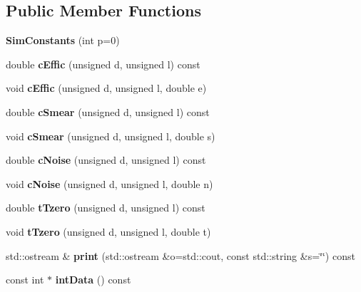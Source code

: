 \subsection*{Public Member Functions}
\begin{DoxyCompactItemize}
\item 
{\bfseries Sim\-Constants} (int p=0)\label{classTBTrack_1_1SimConstants_ac985b42953f6a9db670ac9ebe4491dd3}

\item 
double {\bfseries c\-Effic} (unsigned d, unsigned l) const \label{classTBTrack_1_1SimConstants_a95b2a640d1fdf43d0e138df1c59097da}

\item 
void {\bfseries c\-Effic} (unsigned d, unsigned l, double e)\label{classTBTrack_1_1SimConstants_a57422e75c11ad31c3f76d5ed5357685f}

\item 
double {\bfseries c\-Smear} (unsigned d, unsigned l) const \label{classTBTrack_1_1SimConstants_a5ad8399a9a26ae1a2c8a143a0e34b54d}

\item 
void {\bfseries c\-Smear} (unsigned d, unsigned l, double s)\label{classTBTrack_1_1SimConstants_aef787d85563deecf9fcaf23130e1e6af}

\item 
double {\bfseries c\-Noise} (unsigned d, unsigned l) const \label{classTBTrack_1_1SimConstants_a05135b1be10f15e90b164c2aabd8ae1b}

\item 
void {\bfseries c\-Noise} (unsigned d, unsigned l, double n)\label{classTBTrack_1_1SimConstants_a206034df73ce2b627ca441e078abe2da}

\item 
double {\bfseries t\-Tzero} (unsigned d, unsigned l) const \label{classTBTrack_1_1SimConstants_ac2537bcd88e2578122285edd4387ca1f}

\item 
void {\bfseries t\-Tzero} (unsigned d, unsigned l, double t)\label{classTBTrack_1_1SimConstants_a326a04e3e174301b65c5d8a2605dc531}

\item 
std\-::ostream \& {\bfseries print} (std\-::ostream \&o=std\-::cout, const std\-::string \&s=\char`\"{}\char`\"{}) const \label{classTBTrack_1_1SimConstants_aa6e784ee0e469dd84e9ce779a0a627b4}

\item 
const int $\ast$ {\bfseries int\-Data} () const \label{classTBTrack_1_1SimConstants_a84fb5877bd702e25394576f9b9b8853f}


\end{DoxyCompactItemize}
